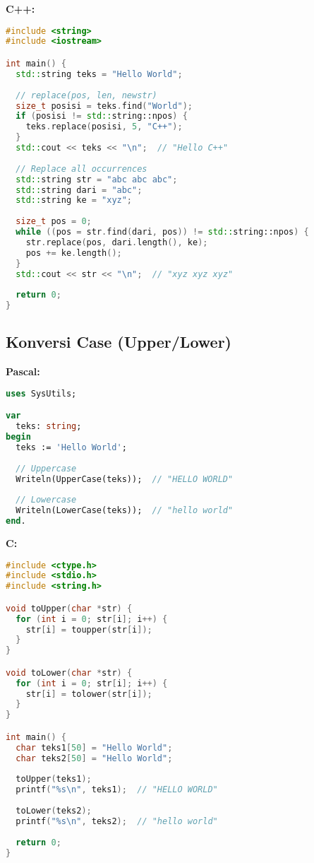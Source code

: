 \documentclass[../main.tex]{subfiles}
\begin{document}
\textbf{C++:}
\begin{lstlisting}[language=C++, caption={Replace di C++}]
#include <string>
#include <iostream>

int main() {
  std::string teks = "Hello World";
  
  // replace(pos, len, newstr)
  size_t posisi = teks.find("World");
  if (posisi != std::string::npos) {
    teks.replace(posisi, 5, "C++");
  }
  std::cout << teks << "\n";  // "Hello C++"
  
  // Replace all occurrences
  std::string str = "abc abc abc";
  std::string dari = "abc";
  std::string ke = "xyz";
  
  size_t pos = 0;
  while ((pos = str.find(dari, pos)) != std::string::npos) {
    str.replace(pos, dari.length(), ke);
    pos += ke.length();
  }
  std::cout << str << "\n";  // "xyz xyz xyz"
  
  return 0;
}
\end{lstlisting}

\subsection{Konversi Case (Upper/Lower)}

\textbf{Pascal:}
\begin{lstlisting}[language=Pascal, caption={Case conversion di Pascal}]
uses SysUtils;

var
  teks: string;
begin
  teks := 'Hello World';
  
  // Uppercase
  Writeln(UpperCase(teks));  // "HELLO WORLD"
  
  // Lowercase
  Writeln(LowerCase(teks));  // "hello world"
end.
\end{lstlisting}

\textbf{C:}
\begin{lstlisting}[language=C, caption={Case conversion di C}]
#include <ctype.h>
#include <stdio.h>
#include <string.h>

void toUpper(char *str) {
  for (int i = 0; str[i]; i++) {
    str[i] = toupper(str[i]);
  }
}

void toLower(char *str) {
  for (int i = 0; str[i]; i++) {
    str[i] = tolower(str[i]);
  }
}

int main() {
  char teks1[50] = "Hello World";
  char teks2[50] = "Hello World";
  
  toUpper(teks1);
  printf("%s\n", teks1);  // "HELLO WORLD"
  
  toLower(teks2);
  printf("%s\n", teks2);  // "hello world"
  
  return 0;
}
\end{lstlisting}
\end{document}

